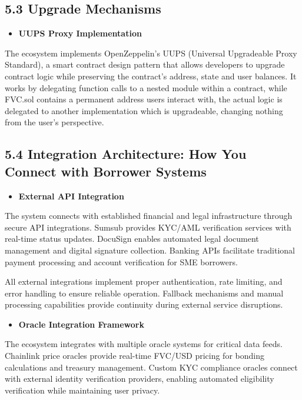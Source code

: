 \documentclass[
  paper=a4,
  ,captions=tableheading
]{scrartcl}
\providecommand{\tightlist}{%
  \setlength{\itemsep}{0pt}\setlength{\parskip}{0pt}}
\begin{document}
\subsection{5.3 Upgrade Mechanisms}\label{upgrade-mechanisms}

\begin{itemize}
\tightlist
\item
  \textbf{UUPS Proxy Implementation}
\end{itemize}

The ecosystem implements OpenZeppelin's UUPS (Universal Upgradeable Proxy
Standard), a smart contract design pattern that allows developers to
upgrade contract logic while preserving the contract's address, state
and user balances. It works by delegating function calls to a nested
module within a contract, while FVC.sol contains a permanent address
users interact with, the actual logic is delegated to another
implementation which is upgradeable, changing nothing from the user's
perspective.

\subsection{5.4 Integration Architecture: How You Connect with Borrower
Systems}\label{integration-architecture-how-you-connect-with-borrower-systems}

\begin{itemize}
\tightlist
\item
  \textbf{External API Integration}
\end{itemize}

The system connects with established financial and legal infrastructure
through secure API integrations. Sumsub provides KYC/AML verification
services with real-time status updates. DocuSign enables automated legal
document management and digital signature collection. Banking APIs
facilitate traditional payment processing and account verification for
SME borrowers.

All external integrations implement proper authentication, rate
limiting, and error handling to ensure reliable operation. Fallback
mechanisms and manual processing capabilities provide continuity during
external service disruptions.

\begin{itemize}
\tightlist
\item
  \textbf{Oracle Integration Framework}
\end{itemize}

The ecosystem integrates with multiple oracle systems for critical data
feeds. Chainlink price oracles provide real-time FVC/USD pricing for
bonding calculations and treasury management. Custom KYC compliance
oracles connect with external identity verification providers, enabling
automated eligibility verification while maintaining user privacy.
\end{document}
